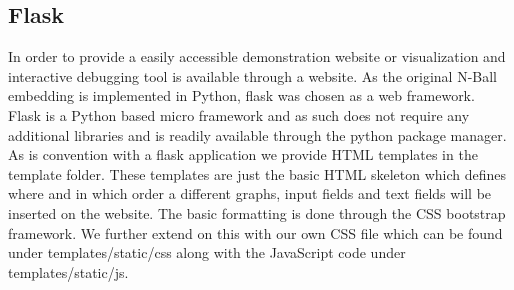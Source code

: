 \documentclass[]{article}
\begin{document}
\subsection{Flask}
\label{sec::flask}
In order to provide a easily accessible demonstration website or visualization and interactive debugging tool is available through a website. As the original N-Ball embedding is implemented in Python, flask was chosen as a web framework.  Flask is a Python based micro framework and as such does not require any additional libraries and is readily available through the python package manager. 
As is convention with a flask application we provide HTML templates in the template folder. These templates are just the basic HTML skeleton which defines where and in which order a different graphs, input fields and text fields will be inserted on the website. The basic formatting is done through the CSS bootstrap framework. We further extend on this with our own CSS file which can be found under templates/static/css along with the JavaScript code under templates/static/js. 
\end{document}
